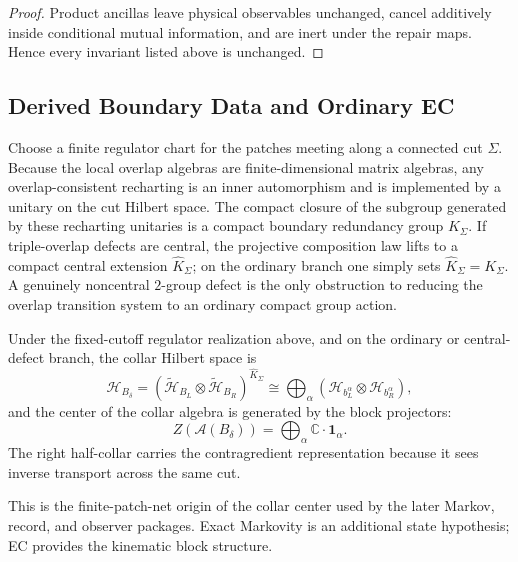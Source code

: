 \begin{proof}
Product ancillas leave physical observables unchanged, cancel additively inside conditional mutual
information, and are inert under the repair maps. Hence every invariant listed above is unchanged.
\end{proof}

\subsection{Derived Boundary Data and Ordinary EC}

\begin{proposition}
Choose a finite regulator chart for the patches meeting along a connected cut \(\Sigma\). Because
the local overlap algebras are finite-dimensional matrix algebras, any overlap-consistent
recharting is an inner automorphism and is implemented by a unitary on the cut Hilbert space. The
compact closure of the subgroup generated by these recharting unitaries is a compact boundary
redundancy group \(K_\Sigma\). If triple-overlap defects are central, the projective composition
law lifts to a compact central extension \(\widehat K_\Sigma\); on the ordinary branch one simply
sets \(\widehat K_\Sigma = K_\Sigma\). A genuinely noncentral \(2\)-group defect is the only
obstruction to reducing the overlap transition system to an ordinary compact group action.
\end{proposition}

\begin{theorem}
Under the fixed-cutoff regulator realization above, and on the ordinary or central-defect branch,
the collar Hilbert space is
\[
\mathcal H_{B_\delta}
=
(\tilde{\mathcal H}_{B_L}\otimes \tilde{\mathcal H}_{B_R})^{\widehat K_\Sigma}
\cong
\bigoplus_{\alpha}
\left(\mathcal H_{b_L^\alpha}\otimes \mathcal H_{b_R^\alpha}\right),
\]
and the center of the collar algebra is generated by the block projectors:
\[
Z(\mathcal A(B_\delta))
=
\bigoplus_\alpha \mathbb C\cdot \mathbf 1_\alpha.
\]
The right half-collar carries the contragredient representation because it sees inverse transport
across the same cut.
\end{theorem}

\begin{remark}
This is the finite-patch-net origin of the collar center used by the later Markov, record, and
observer packages. Exact Markovity is an additional state hypothesis; EC provides the
kinematic block structure.
\end{remark}


